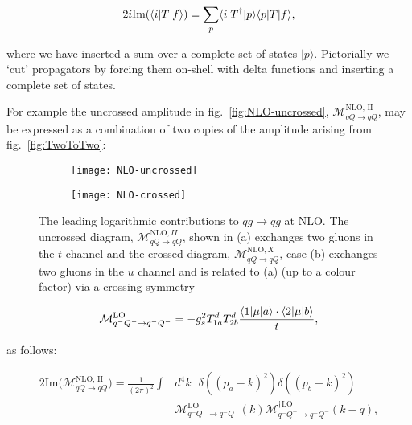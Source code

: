 	\begin{equation}
		2i\text{Im}(\langle i | T | f \rangle) =  \sum_{p}\langle i | T^\dagger | p \rangle\langle p | T | f \rangle,
	\end{equation}

	where we have inserted a sum over a complete set of states $|p\rangle$.  Pictorially we `cut' propagators
	by forcing them on-shell with delta functions and inserting a complete set of states.

	For example the uncrossed amplitude in fig.~\eqref{fig:NLO-uncrossed},
	$\mathcal{M}_{qQ\rightarrow qQ}^{\text{NLO, II}}$, may be expressed as a combination of
	two copies of the amplitude arising from fig.~\eqref{fig:TwoToTwo}:

	\begin{figure}[tpb]

		\centering
		\begin{subfigure}[b]{0.48\textwidth}
			\texttt{[image: NLO-uncrossed]}
			\caption{}
			\label{fig:NLO-uncrossed}
		\end{subfigure}
		\begin{subfigure}[b]{0.48\textwidth}
			\texttt{[image: NLO-crossed]}
			\caption{}
			\label{fig:NLO-crossed}
		\end{subfigure}
		\caption{The leading logarithmic contributions to $qg\rightarrow qg$ at NLO.  The uncrossed
			         diagram, $\mathcal{M}_{qQ\rightarrow qQ}^{\text{NLO}, II}$, shown in (a) exchanges
			         two gluons in the $t$ channel and the crossed diagram,
			         $\mathcal{M}_{qQ\rightarrow qQ}^{\text{NLO}, X}$, case (b) exchanges two gluons
			         in the $u$ channel and is related to (a) (up to a colour factor) via a crossing
			         symmetry}
		\label{fig:NLO-leadingContrib}
	\end{figure}

	\begin{equation}
		\mathcal{M}_{q^-Q^-\rightarrow q^-Q^-}^{\text{LO}} =
		-g_s^2T^d_{1a}T^d_{2b}\frac{\langle 1 | \mu | a \rangle\cdot\langle 2 | \mu | b \rangle}{t},
	\end{equation}

	as follows:

	\begin{align}
		2\text{Im}\Big(\mathcal{M}_{qQ\rightarrow qQ}^{\text{NLO, II}}\Big) =
		\frac{1}{(2\pi)^2}\int &d^4k\text{ }\delta((p_a-k)^2)
		\delta((p_b+k)^2)\\ &\mathcal{M}_{q^-Q^-\rightarrow q^-Q^-}^{\text{LO}}(k)
		\mathcal{M}_{q^-Q^-\rightarrow q^-Q^-}^{\dagger\text{LO}}(k-q),
	\end{align}

